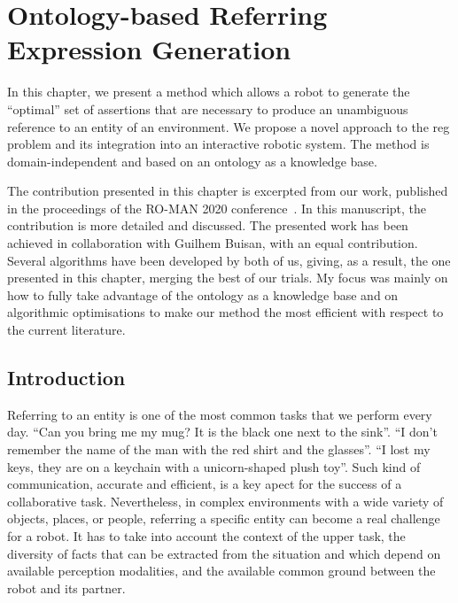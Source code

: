 \ifdefined{}
\else
\setcounter{chapter}{4} %
\dominitoc
\faketableofcontents
\fi

\chapter{Ontology-based Referring Expression Generation}
\label{chap:4}
\minitoc

In this chapter, we present a method which allows a robot to generate the ``optimal'' set of assertions that are necessary to produce an unambiguous reference to an entity of an environment. We propose a novel approach to the \acrfull{reg} problem and its integration into an interactive robotic system. The method is domain-independent and based on an ontology as a knowledge base.

The contribution presented in this chapter is excerpted from our work, published in the proceedings of the RO-MAN 2020 conference~\cite{buisan_2020_efficient}. In this manuscript, the contribution is more detailed and discussed. The presented work has been achieved in collaboration with Guilhem Buisan, with an equal contribution. Several algorithms have been developed by both of us, giving, as a result, the one presented in this chapter, merging the best of our trials. My focus was mainly on how to fully take advantage of the ontology as a knowledge base and on algorithmic optimisations to make our method the most efficient with respect to the current literature.

\section{Introduction}

Referring to an entity is one of the most common tasks that we perform every day. ``Can you bring me my mug? It is the black one next to the sink''. ``I don't remember the name of the man with the red shirt and the glasses''. ``I lost my keys, they are on a keychain with a unicorn-shaped plush toy''. Such kind of communication, accurate and efficient, is a key apect for the success of a collaborative task. Nevertheless, in complex environments with a wide variety of objects, places, or people, referring a specific entity can become a real challenge for a robot. It has to take into account the context of the upper task, the diversity of facts that can be extracted from the situation and which depend on available perception modalities, and the available common ground between the robot and its partner. 

